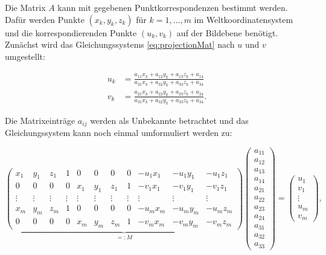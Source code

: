 
Die Matrix $A$ kann mit gegebenen Punktkorrespondenzen bestimmt werden. Dafür werden Punkte $(x_k,y_k,z_k)$ für $k = 1,\dotsc,m$ im Weltkoordinatensystem und die korrespondierenden Punkte $(u_k, v_k)$ auf der Bildebene benötigt.
Zunächst wird das Gleichungssystems \ref{eq:projectionMat} nach $u$ und $v$ umgestellt:

\[
 \begin{aligned}
 u_k &= \frac{a_{11} x_k +a_{12}y_k + a_{13}z_k + a_{14}}{a_{31} x_k +a_{32}y_k + a_{33}z_k + a_{34}} \\
 v_k &= \frac{a_{21} x_k +a_{22}y_k + a_{23}z_k + a_{24}}{a_{31} x_k +a_{32}y_k + a_{33}z_k + a_{34}}.
 \end{aligned}
\]

Die Matrixeinträge $a_{ij}$ werden als Unbekannte betrachtet und das Gleichungssystem kann noch einmal umformuliert werden zu:

 \setcounter{MaxMatrixCols}{20}
\begin{equation}\label{eq:DLT}
\underbrace{\begin{pmatrix}
x_1 & y_1 & z_1 & 1 & 0 & 0 & 0 & 0 & -u_1 x_1 & -u_1 y_1 & -u_1z_1 \\
0 & 0 & 0 & 0 & x_1 & y_1 & z_1 & 1 & -v_1x_1 & -v_1y_1 & -v_1z_1 \\
\vdots & \vdots & \vdots & \vdots & \vdots & \vdots & \vdots & \vdots & \vdots & \vdots & \vdots\\
x_m & y_m & z_m & 1 & 0 & 0 & 0 & 0 & -u_m x_m & -u_m y_m & -u_m z_m \\
0 & 0 & 0 & 0 & x_m & y_m & z_m & 1 & -v_mx_m & -v_my_m & -v_mz_m
\end{pmatrix}}_{=:M}
\begin{pmatrix}
a_{11} \\ a_{12} \\ a_{13} \\ a_{14} \\ a_{21} \\ a_{22} \\ a_{23} \\ a_{24} \\ a_{31} \\ a_{32} \\ a_{33}
\end{pmatrix} =
\begin{pmatrix}
u_1 \\ v_1 \\ \vdots \\ u_m \\ v_m
\end{pmatrix},
\end{equation}

